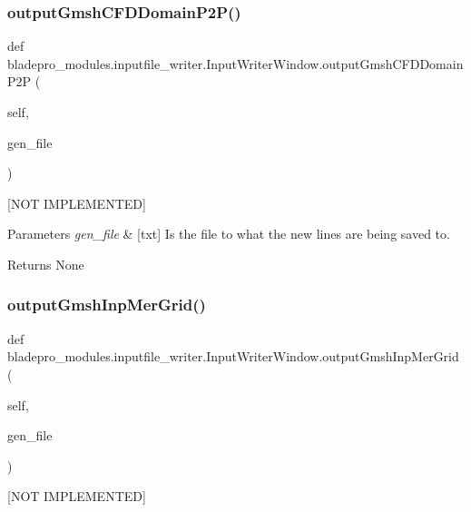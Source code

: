 \subsubsection{\texorpdfstring{output\+Gmsh\+C\+F\+D\+Domain\+P2\+P()}{outputGmshCFDDomainP2P()}}
{\footnotesize\ttfamily def bladepro\+\_\+modules.\+inputfile\+\_\+writer.\+Input\+Writer\+Window.\+output\+Gmsh\+C\+F\+D\+Domain\+P2P (\begin{DoxyParamCaption}\item[{}]{self,  }\item[{}]{gen\+\_\+file }\end{DoxyParamCaption})}



\mbox{[}N\+OT I\+M\+P\+L\+E\+M\+E\+N\+T\+ED\mbox{]} 


\begin{DoxyParams}{Parameters}
{\em gen\+\_\+file} & \mbox{[}txt\mbox{]} Is the file to what the new lines are being saved to. \\
\hline
\end{DoxyParams}
\begin{DoxyReturn}{Returns}
None 
\end{DoxyReturn}
\hypertarget{a00073_a258f943645c60945cbb97494db0ebf52}{}\label{a00073_a258f943645c60945cbb97494db0ebf52} 
\subsubsection{\texorpdfstring{output\+Gmsh\+Inp\+Mer\+Grid()}{outputGmshInpMerGrid()}}
{\footnotesize\ttfamily def bladepro\+\_\+modules.\+inputfile\+\_\+writer.\+Input\+Writer\+Window.\+output\+Gmsh\+Inp\+Mer\+Grid (\begin{DoxyParamCaption}\item[{}]{self,  }\item[{}]{gen\+\_\+file }\end{DoxyParamCaption})}



\mbox{[}N\+OT I\+M\+P\+L\+E\+M\+E\+N\+T\+ED\mbox{]} 


